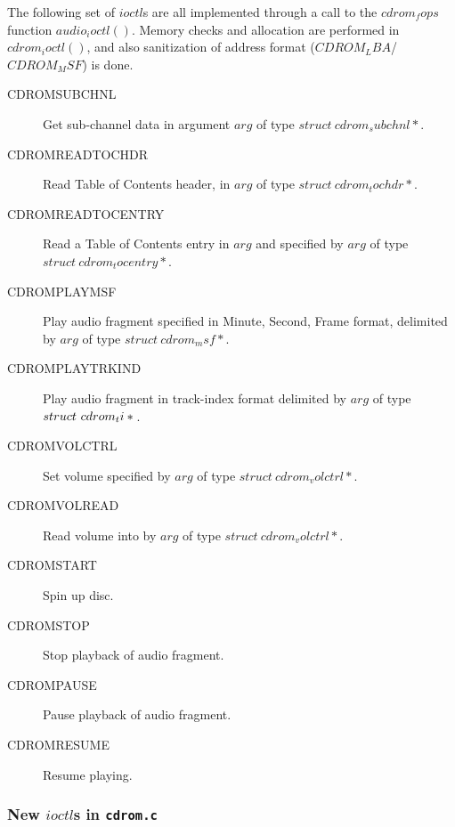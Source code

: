 \documentclass{article}
\def\cdromc{{\tt {cdrom.c}}}
\begin{document}
The following set of $ioctl$s are all implemented through a call to
the $cdrom_fops$ function $audio_ioctl()$. Memory checks and
allocation are performed in $cdrom_ioctl()$, and also sanitization of
address format ($CDROM_LBA$/$CDROM_MSF$) is done.
\begin{description}
\item[CDROMSUBCHNL] Get sub-channel data in argument $arg$ of type $struct\
cdrom_subchnl *{}$.
\item[CDROMREADTOCHDR] Read Table of Contents header, in $arg$ of type
$struct\ cdrom_tochdr *{}$. 
\item[CDROMREADTOCENTRY] Read a Table of Contents entry in $arg$ and
specified by $arg$ of type $struct\ cdrom_tocentry *{}$.
\item[CDROMPLAYMSF] Play audio fragment specified in Minute, Second,
Frame format, delimited by $arg$ of type $struct\ cdrom_msf *{}$.
\item[CDROMPLAYTRKIND] Play audio fragment in track-index format
delimited by $arg$ of type $struct\ \penalty-1000 cdrom_ti *{}$.
\item[CDROMVOLCTRL] Set volume specified by $arg$ of type $struct\
cdrom_volctrl *{}$.
\item[CDROMVOLREAD] Read volume into by $arg$ of type $struct\
cdrom_volctrl *{}$.
\item[CDROMSTART] Spin up disc.
\item[CDROMSTOP] Stop playback of audio fragment.
\item[CDROMPAUSE] Pause playback of audio fragment.
\item[CDROMRESUME] Resume playing.
\end{description}

\subsubsection{New $ioctl$s in \cdromc}
\end{document}
